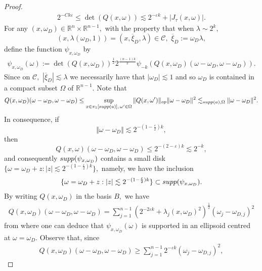 \documentclass[12pt, reqno]{amsart}
\theoremstyle{definition}
\theoremstyle{remark}
\numberwithin{equation}{section}
\begin{document}
\begin{proof}
\begin{align}\label{lower:bounde:det:Q}
    2^{-Ck\varepsilon}\leq \det(Q(x,\omega))\lesssim  2^{-\varepsilon k}+|J_\tau(x,\omega)|.
\end{align}
For any $(x,\omega_D)\in \mathbb{R}^{n}\times\mathbb{R}^{n-1},$ with the property that when $\lambda\sim 2^{k},$ 
$$(x,\lambda(\omega_D,1))=(x,\overline{\xi}_D,\lambda)\in \mathscr{C}, \,\,\overline{\xi}_D:=\omega_D\lambda ,$$
 define the function $\psi_{x,\omega_D}$ by
\begin{align}\label{phi:x:omega:D}
    \psi_{x,\omega_D}(\omega):=\det(Q(x,\omega_D))^{\frac{1}{2}}{ 2^{\frac{(n-1)k}{2}}\psi_{-k}(Q(x,\omega_D)(\omega-\omega_D,\omega-\omega_D))   }.
\end{align} Since on $\mathscr{C},$ $|\overline{\xi}_D|\lesssim \lambda$ we necessarily have that $|\omega_D|\lesssim 1$ and so $\omega_D$ is contained in a compact subset $\Omega$ of $\mathbb{R}^{n-1}.$ 
Note that
\begin{align*}
 Q(x,\omega_D)(\omega-\omega_D,\omega-\omega_D)\leq \sup_{x\in \pi_{1}[\textnormal{supp}(a)],\,\omega'\in \Omega }\Vert Q(x,\omega')\Vert_{\textnormal{op}}\Vert \omega-\omega_D\Vert^{2}\lesssim_{\textnormal{supp}(a),\Omega}   \Vert \omega-\omega_D\Vert^{2}.
\end{align*}In consequence, if 
$$\Vert \omega-\omega_D\Vert\lesssim 2^{-(1-\frac{\varepsilon}{2})k},$$ then 
$$Q(x,\omega)(\omega-\omega_D,\omega-\omega_D)\leq 2^{-(2-\varepsilon)k}\lesssim 2^{-k},$$ and consequently $\textnormal{supp}(\psi_{x,\omega_D})$ contains a small disk $\{\omega=\omega_D+z:|z|\lesssim 2^{-(1-\frac{\varepsilon}{2})k} \},$ namely, we have the inclusion
\begin{align}\label{A1}
    \{\omega=\omega_D+z:|z|\lesssim 2^{-(1-\frac{\varepsilon}{2})k} \}\subset \textnormal{supp}(\psi_{x,\omega_D}).
\end{align}
 By writing $Q(x,\omega_D)$ in the basis $B,$ we have
\begin{align*}
    Q(x,\omega_D)(\omega-\omega_D,\omega-\omega_D)=\sum_{j=1}^{n-1}(2^{-2\varepsilon k}+\lambda_j(x,\omega_D)^{2})^{\frac{1}{2}}(\omega_j-\omega_{D,j})^{2}
\end{align*} from where one can deduce that $\psi_{x,\omega_D}(\omega)$ is supported in an ellipsoid centred at $\omega=\omega_D.$ 
Observe that, since 
\begin{align}\label{aux:disc:quadratic:form}
    Q(x,\omega_D)(\omega-\omega_D,\omega-\omega_D)\geq \sum_{j=1}^{n-1}2^{-\varepsilon k}(\omega_j-\omega_{D,j})^{2},

\end{align}
\end{proof}
\end{document}
